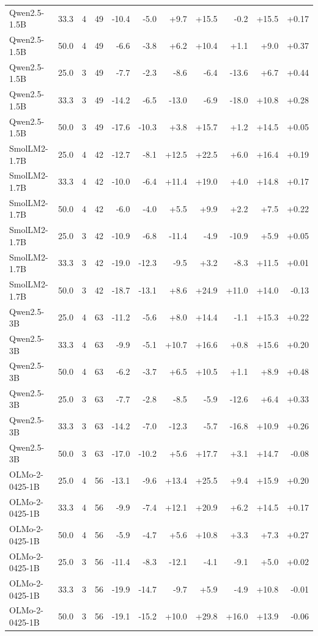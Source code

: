\documentclass{article}
\begin{document}
\begin{longtable}{lrrrrrrrrrr}
Qwen2.5-1.5B & 33.3 & 4 & 49 & -10.4 & -5.0 & +9.7 & +15.5 & -0.2 & +15.5 & +0.17 \\
Qwen2.5-1.5B & 50.0 & 4 & 49 & -6.6 & -3.8 & +6.2 & +10.4 & +1.1 & +9.0 & +0.37 \\
Qwen2.5-1.5B & 25.0 & 3 & 49 & -7.7 & -2.3 & -8.6 & -6.4 & -13.6 & +6.7 & +0.44 \\
Qwen2.5-1.5B & 33.3 & 3 & 49 & -14.2 & -6.5 & -13.0 & -6.9 & -18.0 & +10.8 & +0.28 \\
Qwen2.5-1.5B & 50.0 & 3 & 49 & -17.6 & -10.3 & +3.8 & +15.7 & +1.2 & +14.5 & +0.05 \\
SmolLM2-1.7B & 25.0 & 4 & 42 & -12.7 & -8.1 & +12.5 & +22.5 & +6.0 & +16.4 & +0.19 \\
SmolLM2-1.7B & 33.3 & 4 & 42 & -10.0 & -6.4 & +11.4 & +19.0 & +4.0 & +14.8 & +0.17 \\
SmolLM2-1.7B & 50.0 & 4 & 42 & -6.0 & -4.0 & +5.5 & +9.9 & +2.2 & +7.5 & +0.22 \\
SmolLM2-1.7B & 25.0 & 3 & 42 & -10.9 & -6.8 & -11.4 & -4.9 & -10.9 & +5.9 & +0.05 \\
SmolLM2-1.7B & 33.3 & 3 & 42 & -19.0 & -12.3 & -9.5 & +3.2 & -8.3 & +11.5 & +0.01 \\
SmolLM2-1.7B & 50.0 & 3 & 42 & -18.7 & -13.1 & +8.6 & +24.9 & +11.0 & +14.0 & -0.13 \\
Qwen2.5-3B & 25.0 & 4 & 63 & -11.2 & -5.6 & +8.0 & +14.4 & -1.1 & +15.3 & +0.22 \\
Qwen2.5-3B & 33.3 & 4 & 63 & -9.9 & -5.1 & +10.7 & +16.6 & +0.8 & +15.6 & +0.20 \\
Qwen2.5-3B & 50.0 & 4 & 63 & -6.2 & -3.7 & +6.5 & +10.5 & +1.1 & +8.9 & +0.48 \\
Qwen2.5-3B & 25.0 & 3 & 63 & -7.7 & -2.8 & -8.5 & -5.9 & -12.6 & +6.4 & +0.33 \\
Qwen2.5-3B & 33.3 & 3 & 63 & -14.2 & -7.0 & -12.3 & -5.7 & -16.8 & +10.9 & +0.26 \\
Qwen2.5-3B & 50.0 & 3 & 63 & -17.0 & -10.2 & +5.6 & +17.7 & +3.1 & +14.7 & -0.08 \\
OLMo-2-0425-1B & 25.0 & 4 & 56 & -13.1 & -9.6 & +13.4 & +25.5 & +9.4 & +15.9 & +0.20 \\
OLMo-2-0425-1B & 33.3 & 4 & 56 & -9.9 & -7.4 & +12.1 & +20.9 & +6.2 & +14.5 & +0.17 \\
OLMo-2-0425-1B & 50.0 & 4 & 56 & -5.9 & -4.7 & +5.6 & +10.8 & +3.3 & +7.3 & +0.27 \\
OLMo-2-0425-1B & 25.0 & 3 & 56 & -11.4 & -8.3 & -12.1 & -4.1 & -9.1 & +5.0 & +0.02 \\
OLMo-2-0425-1B & 33.3 & 3 & 56 & -19.9 & -14.7 & -9.7 & +5.9 & -4.9 & +10.8 & -0.01 \\
OLMo-2-0425-1B & 50.0 & 3 & 56 & -19.1 & -15.2 & +10.0 & +29.8 & +16.0 & +13.9 & -0.06 \\
\bottomrule\end{longtable}
\end{document}
